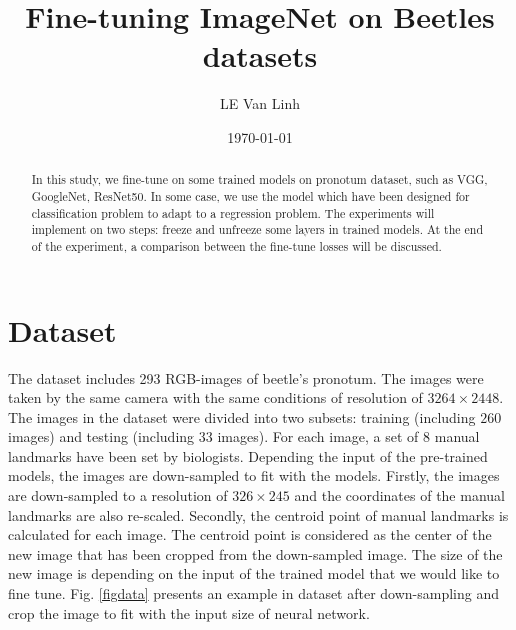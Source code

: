 \documentclass[12pt,a4paper]{article}
\begin{document}
\title{Fine-tuning ImageNet on Beetles datasets}
\author{LE Van Linh}
\date{\today}
\maketitle
\begin{abstract}
	In this study, we fine-tune on some trained models on pronotum dataset, such as VGG, GoogleNet, ResNet50. In some case, we use the model which have been designed for classification problem to adapt to a regression problem. The experiments will implement on two steps: freeze and unfreeze some layers in trained models. At the end of the experiment, a comparison between the fine-tune losses will be discussed.
\end{abstract}
\section{Dataset}
The dataset includes 293 RGB-images of beetle's pronotum. The images were taken by the same camera with the same conditions of resolution of $3264 \times 2448$. The images in the dataset were divided into two subsets: training (including $260$ images) and testing (including $33$ images). For each image, a set of 8 manual landmarks have been set by biologists. Depending the input of the pre-trained models, the images are down-sampled to fit with the models. Firstly, the images are down-sampled to a resolution of $326 \times 245$ and the coordinates of the manual landmarks are also re-scaled. Secondly, the centroid point of manual landmarks is calculated for each image. The centroid point is considered as the center of the new image that has been cropped from the down-sampled image. The size of the new image is depending on the input of the trained model that we would like to fine tune. Fig. \ref{figdata} presents an example in dataset after down-sampling and crop the image to fit with the input size of neural network.
\end{document}
